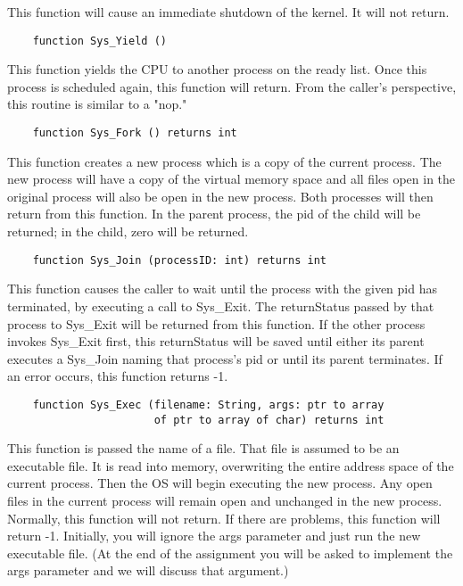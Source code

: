 \documentclass[12pt]{article}
\begin{document}
This function will cause an immediate shutdown of the kernel.  It will
not return.

\begin{verbatim}
    function Sys_Yield ()
\end{verbatim}

This function yields the CPU to another process on the ready list.
Once this process is scheduled again, this function will return.  From
the caller's perspective, this routine is similar to a "nop."

\begin{verbatim}
    function Sys_Fork () returns int
\end{verbatim}

This function creates a new process which is a copy of the current
process.  The new process will have a copy of the virtual memory space
and all files open in the original process will also be open in the
new process.  Both processes will then return from this function.  In
the parent process, the pid of the child will be returned; in the
child, zero will be returned.

\begin{verbatim}
    function Sys_Join (processID: int) returns int
\end{verbatim}

This function causes the caller to wait until the process with the
given pid has terminated, by executing a call to Sys\_Exit.  The
returnStatus passed by that process to Sys\_Exit will be returned from
this function.  If the other process invokes Sys\_Exit first, this
returnStatus will be saved until either its parent executes a Sys\_Join
naming that process's pid or until its parent terminates.  If
an error occurs, this function returns -1.

\begin{verbatim}
    function Sys_Exec (filename: String, args: ptr to array
                       of ptr to array of char) returns int
\end{verbatim}

This function is passed the name of a file.  That file is assumed to
be an executable file.  It is read into memory, overwriting the
entire address space of the current process.  Then the OS will begin
executing the new process.  Any open files in the current process will
remain open and unchanged in the new process. Normally, this function
will not return.  If there are problems, this function will return -1.
Initially, you will ignore the args parameter and just run the new
executable file.   (At the end of the assignment you will be asked
to implement the args parameter and we will discuss that argument.)
\end{document}
